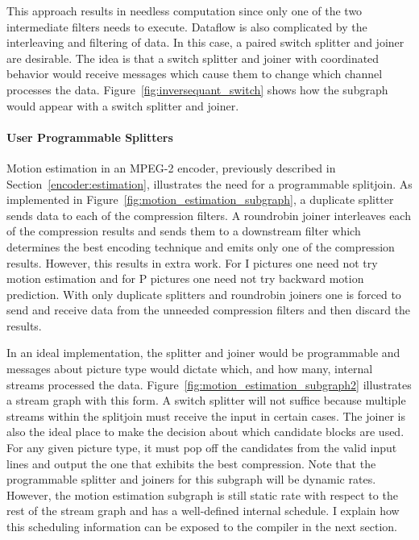This approach results in needless computation since only one of the two intermediate filters 
needs to execute. Dataflow is also complicated by the interleaving and filtering of data. 
In this case, a paired switch splitter and joiner are desirable. The idea is that a switch 
splitter and joiner with coordinated behavior would receive messages which cause them to 
change which channel processes the data. Figure~\ref{fig:inversequant_switch} shows how the 
subgraph would appear with a switch splitter and joiner.

\paragraph{User Programmable Splitters}

Motion estimation in an MPEG-2 encoder, previously described in 
Section~\ref{encoder:estimation}, illustrates the need for a programmable splitjoin. As implemented 
in Figure~\ref{fig:motion_estimation_subgraph}, a duplicate splitter sends data to each of the 
compression filters. A roundrobin joiner interleaves each of the compression results and sends 
them to a downstream filter which determines the best encoding technique and emits only one of 
the compression results. However, this results in extra work. For I pictures one need not try 
motion estimation and for P pictures one need not try backward motion prediction. With only 
duplicate splitters and roundrobin joiners one is forced to send and receive data from the unneeded 
compression filters and then discard the results.

In an ideal implementation, the splitter and joiner would be 
programmable and messages about picture type would dictate which, 
and how many, internal streams processed the data. 
Figure~\ref{fig:motion_estimation_subgraph2} illustrates a stream 
graph with this form. A switch splitter will not suffice because 
multiple streams within the splitjoin must receive the input in 
certain cases. The joiner is also the ideal place to make the 
decision about which candidate blocks are used. For any given picture type, 
it must pop off the candidates from the valid input lines and output 
the one that exhibits the best compression. Note that the 
programmable splitter and joiners for this subgraph will be dynamic rates.
However, the motion estimation subgraph is still static rate with respect
to the rest of the stream graph and has a well-defined internal schedule.
I explain how this scheduling information can be exposed to the 
compiler in the next section.

